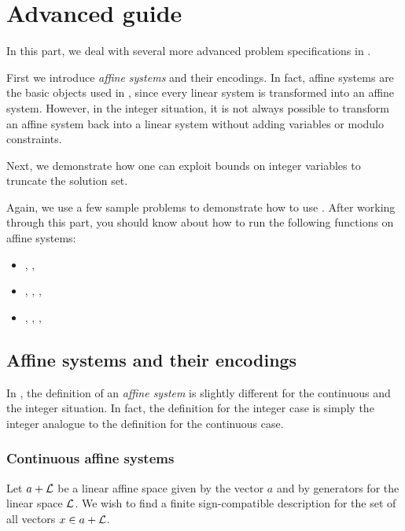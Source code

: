 %
%
%

\chapter{Advanced guide}

In this part, we deal with several more advanced problem
specifications in \FourTiTwo{}.

First we introduce \emph{affine systems} and their encodings. In
fact, affine systems are the basic objects used in \FourTiTwo{},
since every linear system is transformed into an affine system.
However, in the integer situation, it is not always possible to
transform an affine system back into a linear system without adding
variables or modulo constraints.

Next, we demonstrate how one can exploit bounds on integer variables
to truncate the solution set.

Again, we use a few sample problems to demonstrate how to use
\FourTiTwo{}. After working through this part, you should know about
how to run the following functions on affine systems:
\begin{itemize}
\item {}, , 
\item {}, , , 
\item {}, , , 
\end{itemize}


\section{Affine systems and their encodings}

In \FourTiTwo, the definition of an \emph{affine system} is slightly
different for the continuous and the integer situation. In fact, the
definition for the integer case is simply the integer analogue to
the definition for the continuous case.

\subsection{Continuous affine systems}

Let $a+\mathcal{L}$ be a linear affine space given by the vector $a$
and by generators for the linear space $\mathcal{L}$. We wish to find a
finite sign-compatible description for the set of all vectors $x\in
a+\mathcal{L}$.

